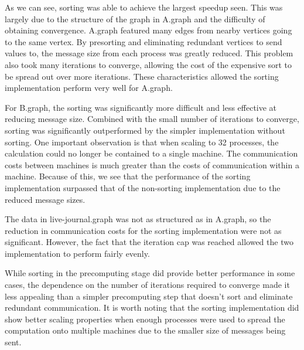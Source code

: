 \documentclass[a4paper]{article}
\begin{document}
As we can see, sorting was able to achieve the largest speedup seen. This was largely due to the structure of the graph in A.graph and the difficulty
of obtaining convergence. A.graph featured many edges from nearby vertices going to the same vertex. By presorting and eliminating redundant vertices
to send values to, the message size from each process was greatly reduced. This problem also took many iterations to converge, allowing the cost of
the expensive sort to be spread out over more iterations. These characteristics allowed the sorting implementation perform very well for A.graph.

For B.graph, the sorting was significantly more difficult and less effective at reducing message size. Combined with the small number of iterations to
converge, sorting was significantly outperformed by the simpler implementation without sorting. One important observation is that when scaling to 32
processes, the calculation could no longer be contained to a single machine. The communication costs between machines is much greater than the costs
of communication within a machine. Because of this, we see that the performance of the sorting implementation surpassed that of the non-sorting
implementation due to the reduced message sizes.

The data in live-journal.graph was not as structured as in A.graph, so the reduction in communication costs for the sorting implementation were not as
significant. However, the fact that the iteration cap was reached allowed the two implementation to perform fairly evenly.

While sorting in the precomputing stage did provide better performance in some cases, the dependence on the number of iterations required to converge
made it less appealing than a simpler precomputing step that doesn't sort and eliminate redundant communication. It is worth noting that the sorting
implementation did show better scaling properties when enough processes were used to spread the computation onto multiple machines due to the smaller
size of messages being sent.
\end{document}
